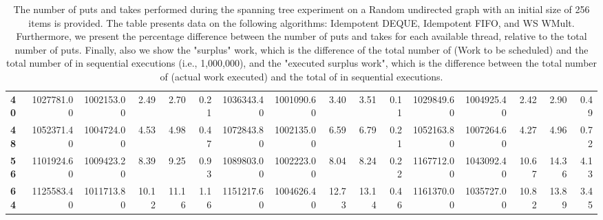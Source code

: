 \begin{table}[!ht]
{\begin{tabular}{lrrrrrrrrrrrrrrr}
\textbf{40} &       1027781.00 & 1002153.00 &           2.49 &        2.70 &                 0.21 &      1036343.40 & 1001090.60 &           3.40 &        3.51 &                 0.11 & 1029849.60 & 1004925.40 &           2.42 &        2.90 &                 0.49 \\
\textbf{48} &       1052371.40 & 1004724.00 &           4.53 &        4.98 &                 0.47 &      1072843.80 & 1002135.00 &           6.59 &        6.79 &                 0.21 & 1052163.80 & 1007264.60 &           4.27 &        4.96 &                 0.72 \\
\textbf{56} &       1101924.60 & 1009423.20 &           8.39 &        9.25 &                 0.93 &      1089803.00 & 1002223.00 &           8.04 &        8.24 &                 0.22 & 1167712.00 & 1043092.40 &          10.67 &       14.36 &                 4.13 \\
\textbf{64} &       1125583.40 & 1011713.80 &          10.12 &       11.16 &                 1.16 &      1151217.60 & 1004626.40 &          12.73 &       13.14 &                 0.46 & 1161370.00 & 1035727.00 &          10.82 &       13.89 &                 3.45 \\
\bottomrule
\end{tabular}}
\label{difference-Random_undirected-256-IDEMPOTENT_DEQUE-IDEMPOTENT_FIFO-WS_NC_MULT_OPT}
\caption{The number of puts and takes performed during the
    spanning tree experiment on a Random undirected graph with an initial size
    of 256 items is provided. The table presents data on the
    following algorithms: Idempotent DEQUE, Idempotent FIFO, and
    WS WMult. Furthermore, we present the percentage difference
    between the number of puts and takes for each available thread,
    relative to the total number of puts. Finally, also we show the
    "surplus" work, which is the difference of the total number of
    \Puts (Work to be scheduled) and the total number of \Puts in
    sequential executions (i.e., 1,000,000), and the "executed surplus
    work", which is the difference between the total number of \Takes
    (actual work executed) and the total of \Takes in sequential
    executions.}
\end{table}
